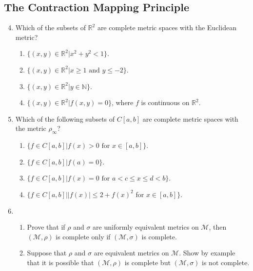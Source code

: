 \documentclass{article}
\begin{document}
\subsection{The Contraction Mapping Principle}
\begin{enumerate}
      \setcounter{enumi}{3}
      \item Which of the subsets of $\mathbb{R}^2$ are complete metric spaces
            with the Euclidean metric?
            \begin{enumerate}
                  \item $\{(x, y)\in\mathbb{R}^2|x^2+y^2<1 \}$.
                  \item $\{(x, y)\in\mathbb{R}^2|x\geq 1\text{ and }y\leq -2\}$.
                  \item $\{(x, y)\in\mathbb{R}^2|y\in\mathbb{N} \}$.
                  \item $\{(x, y)\in\mathbb{R}^2|f(x,y)=0 \}$, where $f$ is
                        continuous on $\mathbb{R}^2$.
            \end{enumerate}
      \item Which of the following subsets of $C[a,b]$ are complete metric
            spaces with the metric $\rho_\infty$?
            \begin{enumerate}
                  \item $\{f\in C[a,b]|f(x)>0\text{ for }x\in [a,b]\}$.
                  \item $\{f\in C[a,b]|f(a)=0\}$.
                  \item $\{f\in C[a,b]|f(x)=0\text{ for }a<c\leq x\leq d<b\}$.
                  \item $\{f\in C[a,b]|\lvert f(x)\rvert\leq 2+f(x)^2$
                        for $x\in[a,b]\}$.
            \end{enumerate}
            \setcounter{enumi}{9}
      \item \begin{enumerate}
                  \item Prove that if $\rho$ and $\sigma$ are uniformly
                        equivalent metrics on $\mathcal{M}$, then
                        $(\mathcal{M}, \rho)$ is complete only if
                        $(\mathcal{M}, \sigma)$ is complete.
                  \item Suppose that $\rho$ and $\sigma$ are equivalent metrics
                        on $\mathcal{M}$. Show by example that it is possible
                        that $(\mathcal{M}, \rho)$ is complete but
                        $(\mathcal{M}, \sigma)$ is not complete.

\end{enumerate}
\end{enumerate}
\end{document}
